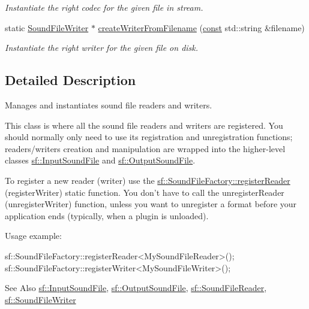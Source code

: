 \begin{DoxyCompactItemize}
\begin{DoxyCompactList}\small\item\em Instantiate the right codec for the given file in stream. \end{DoxyCompactList}\item 
static \hyperlink{classsf_1_1_sound_file_writer}{Sound\-File\-Writer} $\ast$ \hyperlink{classsf_1_1_sound_file_factory_a0702eb2e8a4a171ba80c7fbd04c4defc}{create\-Writer\-From\-Filename} (\hyperlink{term__entry_8h_a57bd63ce7f9a353488880e3de6692d5a}{const} std\-::string \&filename)
\begin{DoxyCompactList}\small\item\em Instantiate the right writer for the given file on disk. \end{DoxyCompactList}\end{DoxyCompactItemize}


\subsection{Detailed Description}
Manages and instantiates sound file readers and writers. 

This class is where all the sound file readers and writers are registered. You should normally only need to use its registration and unregistration functions; readers/writers creation and manipulation are wrapped into the higher-\/level classes \hyperlink{classsf_1_1_input_sound_file}{sf\-::\-Input\-Sound\-File} and \hyperlink{classsf_1_1_output_sound_file}{sf\-::\-Output\-Sound\-File}.

To register a new reader (writer) use the \hyperlink{classsf_1_1_sound_file_factory_acaf1f0bf1b7c7b9988ec76b33e33fe95}{sf\-::\-Sound\-File\-Factory\-::register\-Reader} (register\-Writer) static function. You don't have to call the unregister\-Reader (unregister\-Writer) function, unless you want to unregister a format before your application ends (typically, when a plugin is unloaded).

Usage example\-: 
\begin{DoxyCode}
sf::SoundFileFactory::registerReader<MySoundFileReader>();
sf::SoundFileFactory::registerWriter<MySoundFileWriter>();
\end{DoxyCode}


\begin{DoxySeeAlso}{See Also}
\hyperlink{classsf_1_1_input_sound_file}{sf\-::\-Input\-Sound\-File}, \hyperlink{classsf_1_1_output_sound_file}{sf\-::\-Output\-Sound\-File}, \hyperlink{classsf_1_1_sound_file_reader}{sf\-::\-Sound\-File\-Reader}, \hyperlink{classsf_1_1_sound_file_writer}{sf\-::\-Sound\-File\-Writer} 
\end{DoxySeeAlso}


